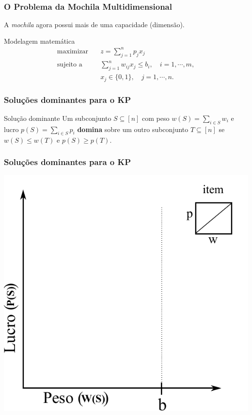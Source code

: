 \documentclass[10pt,fleqn]{beamer}
\renewcommand{\emph}[1]{ {\bf #1} }
\begin{document}
\begin{frame}
  \frametitle{O Problema da Mochila Multidimensional}
  A \textit{mochila} agora possui mais de uma capacidade (dimensão).
  \begin{minipage}{6cm}
    \begin{block}{Modelagem matemática}
    { \footnotesize
       \begin{align*}
         \textrm{maximizar}
           \quad & z = \sum_{j=1}^n p_j x_j \\
         \textrm{sujeito a}
 	        \quad & \sum_{j=1}^n w_{ij}x_j \leq b_i, \quad i=1,\cdots,m, \\
                & x_j \in \{0,1\}, \quad j=1,\cdots,n.
       \end{align*}
	}
	\end{block}
    \end{minipage}
\end{frame}

\begin{frame}
  \frametitle{Soluções dominantes para o KP}
  \begin{minipage}{10cm}
    \begin{block}{Solução dominante}
    Um subconjunto $S \subseteq [n]$ com peso $w(S) = \sum_{i \in S} w_i$ e lucro 
	  $p(S) = \sum_{i \in S} p_i$ \emph{domina} sobre um outro subconjunto
	  $T \subseteq [n]$ se $w(S) \leqslant w(T)$ e $p(S) \geqslant p(T)$.
	\end{block}
  \end{minipage}
\end{frame}

\begin{frame}
  \frametitle{Soluções dominantes para o KP}
	\begin{center}
      \includegraphics[scale=0.7]{figs/axis-1dim}
	\end{center}
\end{frame}
\end{document}
